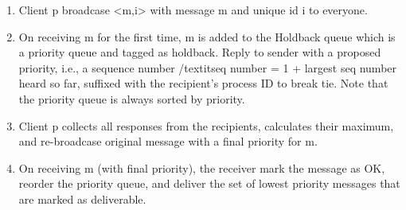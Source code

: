 \begin{enumerate}
\item Client p broadcase  <m,i>  with message m and unique id i to everyone.
 
\item On receiving m for the first time, m is added to the Holdback queue which is a priority queue and tagged as holdback. Reply to sender with a proposed priority, i.e., a sequence number /textit{seq number} = 1 + largest seq number heard so far, suffixed with the recipient’s process ID to break tie. Note that the priority queue is always sorted by priority.

\item Client p collects all responses from the recipients, calculates their maximum, and 
re-broadcase original message with a final priority for m. 

\item On receiving m (with final priority), the receiver mark the message as OK, reorder the priority queue, and deliver the set of lowest priority messages that are marked as deliverable.
\end{enumerate}


